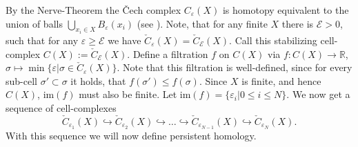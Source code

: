 \documentclass[11pt, a4paper, UKenglish]{article}
\newcommand{\bR}{\mathbb{R}}
\newcommand{\im}{\textrm{im}}
\begin{document}
	By the Nerve-Theorem the Čech complex $C_\varepsilon(X)$ is homotopy equivalent to the union of balls $\bigcup_{x_i\in X} B_\varepsilon(x_i)$ (see \cite{eat}).
    Note, that for any finite $X$ there is  $\mathcal{E}>0$, such that for any $\varepsilon\geq\mathcal{E}$ we have  $\check C_\varepsilon(X) = \check C_\mathcal{E}(X)$.
    Call this stabilizing cell-complex $C(X):=\check C_\mathcal{E}(X)$.
    Define a filtration $f$ on $C(X)$ via $f:C(X)\rightarrow\bR$, $\sigma\mapsto\min\{\varepsilon|\sigma\in \check C_\varepsilon(X)\}$.
    Note that this filtration is well-defined, since for every sub-cell $\sigma'\subset\sigma$ it holds, that $f(\sigma')\leq f(\sigma)$.
    Since $X$ is finite, and hence $C(X)$, $\im(f)$ must also be finite.
    Let $\im(f)=\{\varepsilon_i|0\leq i\leq N\}$.
    We now get a sequence of cell-complexes \[\check C_{\varepsilon_1}(X)\hookrightarrow \check C_{\varepsilon_2}(X)\hookrightarrow \ldots \hookrightarrow \check C_{\varepsilon_{N-1}}(X)\hookrightarrow \check C_{\varepsilon_N}(X).\]
    With this sequence we will now define persistent homology.
\end{document}
